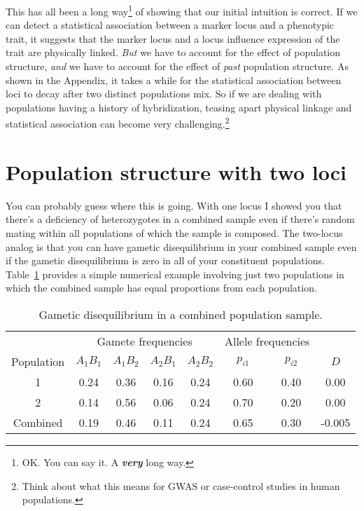 This has all been a long way\footnote{OK. You can say it. A {\bf\it
    very\/} long way.} of showing that our initial intuition is
correct. If we can detect a statistical association between a marker
locus and a phenotypic trait, it suggests that the marker locus and a
locus influence expression of the trait are physically linked. {\it
  But\/} we have to account for the effect of population structure,
{\it and\/} we have to account for the effect of {\it past\/}
population structure. As shown in the Appendix, it takes a while for
the statistical association between loci to decay after two distinct
populations mix. So if we are dealing with populations having a
history of hybridization, teasing apart physical linkage and
statistical association can become very challenging.\footnote{Think
  about what this means for GWAS or case-control studies in human
  populations.} 

\section*{Population structure with two loci}

You can probably guess where this is going. With one locus I showed
you that there's a deficiency of heterozygotes in a combined sample
even if there's random mating within all populations of which the
sample is composed. The two-locus analog is that you can have gametic
disequilibrium in your combined sample even if the gametic
disequilibrium is zero in all of your constituent
populations. Table~\ref{table:d-structure} provides a simple numerical
example involving just two populations in which the combined sample
has equal proportions from each population.

\begin{table}
\begin{center}
\begin{tabular}{c|cccc|cc|c}
\hline\hline
           & \multicolumn{4}{c|}{Gamete frequencies} 
           & \multicolumn{2}{c|}{Allele frequencies} \\
Population & $A_1B_1$ & $A_1B_2$ & $A_2B_1$ & $A_2B_2$ 
           & $p_{i1}$ & $p_{i2}$ & $D$ \\
\hline
1          & 0.24     & 0.36     & 0.16    & 0.24
           & 0.60     & 0.40     & 0.00 \\
2          & 0.14     & 0.56     & 0.06    & 0.24
           & 0.70     & 0.20     & 0.00 \\
Combined   & 0.19     & 0.46     & 0.11    & 0.24
           & 0.65     & 0.30     & -0.005 \\
\hline
\end{tabular}
\end{center}
\caption{Gametic disequilibrium in a combined population
  sample.}\label{table:d-structure}
\end{table}

